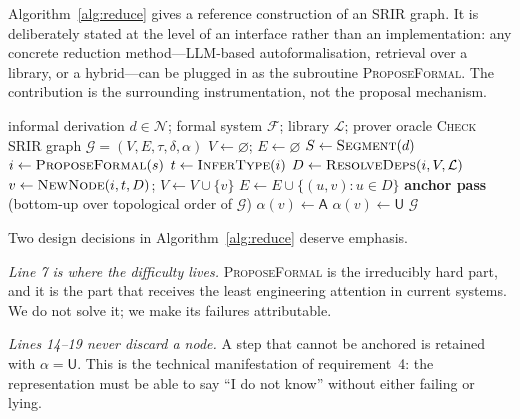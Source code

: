 \documentclass[11pt,a4paper]{article}
\theoremstyle{definition}
\theoremstyle{plain}
\theoremstyle{remark}
\newcommand{\NL}{\mathcal{N}}          %
\newcommand{\FS}{\mathcal{F}}          %
\begin{document}
Algorithm~\ref{alg:reduce} gives a reference construction of an SRIR graph. It
is deliberately stated at the level of an interface rather than an
implementation: any concrete reduction method---LLM-based autoformalisation,
retrieval over a library, or a hybrid---can be plugged in as the subroutine
\textsc{ProposeFormal}. The contribution is the surrounding instrumentation, not
the proposal mechanism.

\begin{algorithm}[t]
\caption{\textsc{ReduceToSRIR} --- instrumented semantic reduction}
\label{alg:reduce}
\begin{algorithmic}[1]
\Require informal derivation $d \in \NL$; formal system $\FS$; library
$\mathcal{L}$; prover oracle \textsc{Check}
\Ensure SRIR graph $\mathcal{G} = (V,E,\tau,\delta,\alpha)$
\State $V \gets \varnothing$;\; $E \gets \varnothing$
\State $S \gets \textsc{Segment}(d)$
  \State $i \gets \textsc{ProposeFormal}(s)$
  \State $t \gets \textsc{InferType}(i)$
  \State $D \gets \textsc{ResolveDeps}(i, V, \mathcal{L})$
  \State $v \gets \textsc{NewNode}(i, t, D)$;\; $V \gets V \cup \{v\}$
  \State $E \gets E \cup \{(u,v) : u \in D\}$
\EndFor
\State \textbf{anchor pass} (bottom-up over topological order of $\mathcal{G}$)
      \State $\alpha(v) \gets \mathsf{A}$
  \Else
      \State $\alpha(v) \gets \mathsf{U}$
  \EndIf
\EndFor
\State \Return $\mathcal{G}$
\end{algorithmic}
\end{algorithm}

Two design decisions in Algorithm~\ref{alg:reduce} deserve emphasis.

\emph{Line 7 is where the difficulty lives.} \textsc{ProposeFormal} is the
irreducibly hard part, and it is the part that receives the least engineering
attention in current systems. We do not solve it; we make its failures
attributable.

\emph{Lines 14--19 never discard a node.} A step that cannot be anchored is
retained with $\alpha = \mathsf{U}$. This is the technical manifestation of
requirement~4: the representation must be able to say ``I do not know'' without
either failing or lying.
\end{document}
